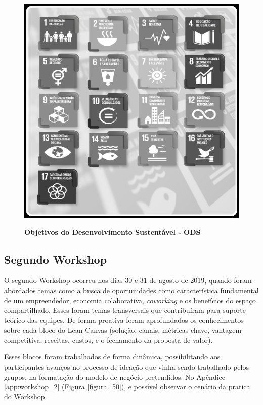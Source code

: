 \begin{figure}[H]
\centering
\caption{\textbf{Objetivos do Desenvolvimento Sustentável - ODS}}
\includegraphics[scale=0.1]{Imagens/ODS_GERAL.png}
\label{fig:ods}
\end{figure}


\subsection{Segundo Workshop}


O segundo Workshop ocorreu nos dias 30 e 31 de agosto de 2019, quando foram abordados temas como a busca de oportunidades como característica fundamental de um empreendedor, economia colaborativa, \textit{coworking} e os benefícios do espaço compartilhado. Esses foram temas transversais que contribuíram para suporte teórico das equipes. De forma proativa foram aprofundados os conhecimentos sobre cada bloco do Lean Canvas (solução, canais, métricas-chave, vantagem competitiva, receitas, custos, e o fechamento da proposta de valor). 

Esses blocos foram trabalhados de forma dinâmica, possibilitando aos participantes avanços no processo de ideação que vinha sendo trabalhado pelos grupos, na formatação do modelo de negócio pretendidos. No Apêndice \ref{app:workshop_2}  (Figura \ref{figura_50}), 
e possível observar o cenário da pratica do Workshop.
 

